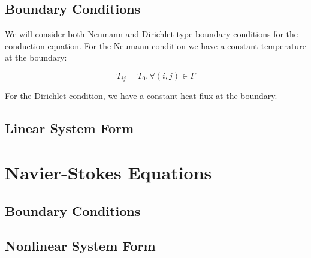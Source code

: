 \documentclass[letterpaper,12pt]{article}
\begin{document}
\subsection{Boundary Conditions}

We will consider both Neumann and Dirichlet type boundary conditions
for the conduction equation. For the Neumann condition we have a
constant temperature at the boundary:

\begin{equation}
  T_{ij} = T_0, \forall (i,j) \in \Gamma
  \label{eq:conduction_neumann}
\end{equation}

For the Dirichlet condition, we have a constant heat flux at the boundary.

\subsection{Linear System Form}

\section{Navier-Stokes Equations}

\subsection{Boundary Conditions}

\subsection{Nonlinear System Form}

\pagebreak
 
\end{document}
